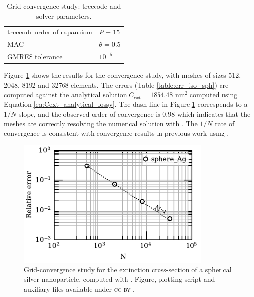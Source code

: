 \begin{table}%
    \centering
    \caption{\label{table:treeparams1} Grid-convergence study: treecode and solver parameters.} 
    \begin{tabular}{l l}
    \hline%
    treecode order of expansion: & $P=15$\\
    MAC                          & $\theta=0.5$\\
    GMRES tolerance                    & $10^{-5}$\\
    \hline%
    \end{tabular}
\end{table}

Figure \ref{fig:conv_iso_sph} shows the results for the convergence study, with meshes of sizes 512, 2048, 
8192 and 32768 elements. The errors (Table \ref{table:err_iso_sph}) are computed against 
the analytical solution $C_{ext} = 1854.48$ nm$^2$ computed using Equation \eqref{eq:Cext_analytical_lossy}.
The dash line in Figure \ref{fig:conv_iso_sph} corresponds to a $1/N$ slope, and the observed order of 
convergence is $0.98$ which indicates that the meshes are correctly resolving the numerical solution with \pygbe.
The $1/N$ rate of convergence is consistent with convergence results in
previous work using \pygbe \cite{CooperBardhanBarba2013}. 

\begin{figure}%
    \centering
    \includegraphics[width=0.85\textwidth]{convergence_sph_Ag_R8_w380.pdf} 
    \caption{Grid-convergence study for the extinction cross-section of a spherical silver
             nanoparticle, computed with \pygbe. Figure, plotting script and auxiliary files 
             available under \textsc{cc-by} \cite{ClementiETal2018c}.}
    \label{fig:conv_iso_sph}
 \end{figure}
 
